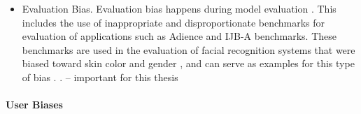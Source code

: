 \documentclass[12pt, a4paper, oneside]{book}   	%
\begin{document}
\begin{itemize}
				\item Evaluation Bias. Evaluation bias happens during model evaluation \autocite{M144_Suresh_2021}. This includes the use of inappropriate and disproportionate benchmarks for evaluation of applications such as Adience and IJB-A benchmarks. These benchmarks are used in the evaluation of facial recognition systems that were biased toward skin color and gender \autocite{M24_Buolamwini_2018}, and can serve as examples for this type of bias \autocite{M144_Suresh_2021}. \autocite{Mehrabi_2021}. -- important for this thesis
			\end{itemize}
			
			\paragraph{User Biases}
			
\end{document}

